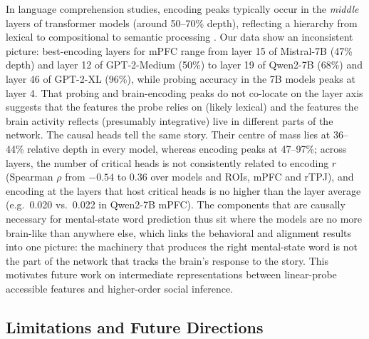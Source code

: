 \documentclass[conference]{IEEEtran}
\begin{document}
In language comprehension studies, encoding peaks typically occur in the \textit{middle} layers of transformer models (around 50--70\% depth), reflecting a hierarchy from lexical to compositional to semantic processing \cite{caucheteux2022brains, schrimpf2021neural}. Our data show an inconsistent picture: best-encoding layers for mPFC range from layer 15 of Mistral-7B (47\% depth) and layer 12 of GPT-2-Medium (50\%) to layer 19 of Qwen2-7B (68\%) and layer 46 of GPT-2-XL (96\%), while probing accuracy in the 7B models peaks at layer 4. That probing and brain-encoding peaks do not co-locate on the layer axis suggests that the features the probe relies on (likely lexical) and the features the brain activity reflects (presumably integrative) live in different parts of the network. The causal heads tell the same story. Their centre of mass lies at 36--44\% relative depth in every model, whereas encoding peaks at 47--97\%; across layers, the number of critical heads is not consistently related to encoding $r$ (Spearman $\rho$ from $-0.54$ to $0.36$ over models and ROIs, mPFC and rTPJ), and encoding at the layers that host critical heads is no higher than the layer average (e.g.\ 0.020 vs.\ 0.022 in Qwen2-7B mPFC). The components that are causally necessary for mental-state word prediction thus sit where the models are no more brain-like than anywhere else, which links the behavioral and alignment results into one picture: the machinery that produces the right mental-state word is not the part of the network that tracks the brain's response to the story. This motivates future work on intermediate representations between linear-probe accessible features and higher-order social inference.

\subsection{Limitations and Future Directions}
\end{document}

